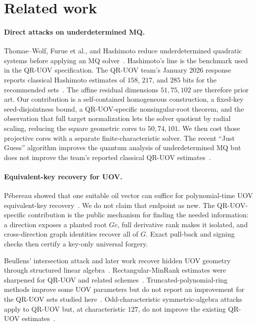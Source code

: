 \documentclass[11pt,a4paper]{article}
\theoremstyle{definition}
\theoremstyle{remark}
\begin{document}
\section{Related work}\label{sec:related}

\paragraph{Direct attacks on underdetermined MQ.}
Thomae--Wolf, Furue et al., and Hashimoto reduce underdetermined quadratic
systems before applying an MQ solver~\cite{ThomaeWolf2012,FurueUnderdetermined2021,Hashimoto2023}.
Hashimoto's line is the benchmark used in the QR-UOV specification.  The
QR-UOV team's January 2026 response reports classical Hashimoto estimates of
$158$, $217$, and $285$ bits for the recommended sets~\cite{QRUOVResponse2026}.
The affine residual dimensions $51,75,102$ are therefore prior art.  Our
contribution is a self-contained homogeneous construction, a fixed-key
seed-disjointness bound, a QR-UOV-specific nonsingular-root theorem, and the
observation that full target normalization lets the solver quotient by radial
scaling, reducing the square geometric cores to $50,74,101$.  We then cost
those projective cores with a separate finite-characteristic solver.  The recent ``Just Guess''
algorithm improves the quantum analysis of underdetermined MQ but does not
improve the team's reported classical QR-UOV estimates~\cite{JustGuess,QRUOVResponse2026}.

\paragraph{Equivalent-key recovery for UOV.}
P\'ebereau showed that one suitable oil vector can suffice for polynomial-time
UOV equivalent-key recovery~\cite{Pebereau}.  We do not claim that endpoint as
new.  The QR-UOV-specific contribution is the public mechanism for finding the
needed information: a direction exposes a planted root $Gc$, full derivative
rank makes it isolated, and cross-direction graph identities recover all of
$G$.  Exact pull-back and signing checks then certify a key-only universal
forgery.

Beullens' intersection attack and later work recover hidden UOV geometry
through structured linear algebra~\cite{Beullens}.  Rectangular-MinRank
estimates were sharpened for QR-UOV and related schemes~\cite{FurueIkematsu,Suzuki}.
Truncated-polynomial-ring methods improve some UOV parameters but do not report
an improvement for the QR-UOV sets studied here~\cite{FurueIkematsu2026}.
Odd-characteristic symmetric-algebra attacks apply to QR-UOV but, at
characteristic $127$, do not improve the existing QR-UOV estimates~\cite{JinEtAl2026}.
\end{document}
